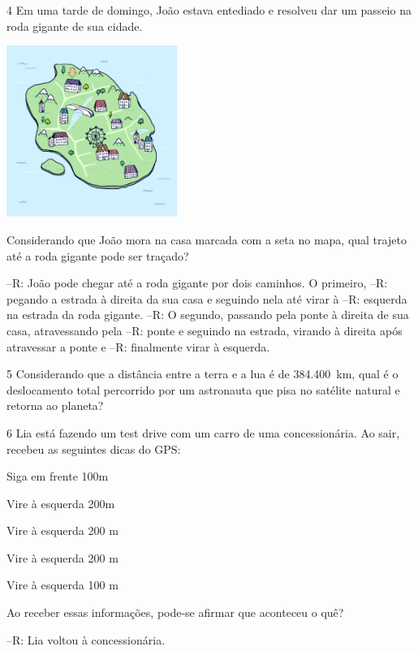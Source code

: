 {\num{4} Em uma tarde de domingo, João estava entediado e resolveu dar um
passeio na roda gigante de sua cidade.

\includegraphics[width=2.2in,height=2.2in]{./imgSAEB_8_MAT/media/image38.png}


Considerando que João mora na casa marcada com a seta no mapa, qual
trajeto até a roda gigante pode ser traçado?

--R: João pode chegar até a roda gigante por dois caminhos. O primeiro,
--R: pegando a estrada à direita da sua casa e seguindo nela até virar à
--R: esquerda na estrada da roda gigante.
--R: O segundo, passando pela ponte à direita de sua casa, atravessando pela
--R: ponte e seguindo na estrada, virando à direita após atravessar a ponte e
--R: finalmente virar à esquerda.

\num{5} Considerando que a distância entre a terra e a lua é de 384.400~km,
qual é o deslocamento total percorrido por um astronauta que pisa no
satélite natural e retorna ao planeta?


\num{6} Lia está fazendo um test drive com um carro de uma concessionária. Ao
sair, recebeu as seguintes dicas do GPS:

Siga em frente 100m

Vire à esquerda 200m

Vire à esquerda 200 m

Vire à esquerda 200 m

Vire à esquerda 100 m

Ao receber essas informações, pode-se afirmar que aconteceu o quê?

--R: Lia voltou à concessionária.

}
